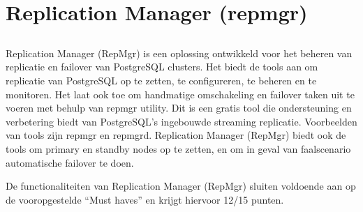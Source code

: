 
\chapter{Replication Manager (repmgr)}
\label{Replication Manager (repmgr)}


\section{}
\label{sec:Inleiding tot Replication Manager (repmgr)}

\section{}
\label{sec:Requirements}

\subsection{}
\label{subsec:Must have}

Replication Manager (RepMgr) is een oplossing ontwikkeld voor het beheren van replicatie en failover van PostgreSQL clusters. Het biedt de tools aan om replicatie van PostgreSQL op te zetten, te configureren, te beheren en te monitoren. Het laat ook toe om handmatige omschakeling en failover taken uit te voeren met behulp van repmgr utility. Dit is een gratis tool die ondersteuning en verbetering biedt van PostgreSQL's ingebouwde streaming replicatie.
Voorbeelden van tools zijn repmgr en repmgrd.
Replication Manager (RepMgr) biedt ook de tools om primary en standby nodes op te zetten, en om in geval van faalscenario automatische failover te doen.

De functionaliteiten van Replication Manager (RepMgr) sluiten voldoende aan op de vooropgestelde “Must haves” en krijgt hiervoor 12/15 punten.

\subsubsection{}
\label{subsubsec:Redundantie/Replicatie}

